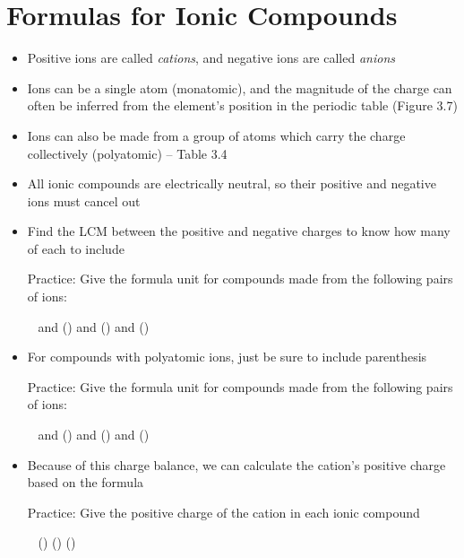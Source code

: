 \documentclass[12pt, openany, letterpaper]{memoir}
\begin{document}
\section{Formulas for Ionic Compounds}
\begin{itemize}
	\item Positive ions are called \emph{cations}, and negative ions are called \emph{anions}
	\item Ions can be a single atom (monatomic), and the magnitude of the charge can often be inferred from the element's position in the periodic table (Figure 3.7)
	\item Ions can also be made from a group of atoms which carry the charge collectively (polyatomic)  -- Table 3.4
	\item All ionic compounds are electrically neutral, so their positive and negative ions must cancel out
	\item Find the LCM between the positive and negative charges to know how many of each to include
	
	Practice: Give the formula unit for compounds made from the following pairs of ions:
	
	~\hphantom{Practice:}  and  () \hspace{1em}  and  () \hspace{1em}   and  ()
	\item For compounds with polyatomic ions, just be sure to include parenthesis
	
	Practice: Give the formula unit for compounds made from the following pairs of ions:
	
	~\hphantom{Practice:}  and  () \hspace{1em}  and  () \hspace{1em}   and  ()
	\item Because of this charge balance, we can calculate the cation's positive charge based on the formula
	
	Practice: Give the positive charge of the cation in each ionic compound
	
	~\hphantom{Practice:}  () \hspace{1em}  () \hspace{1em}  ()
\end{itemize}
\end{document}
